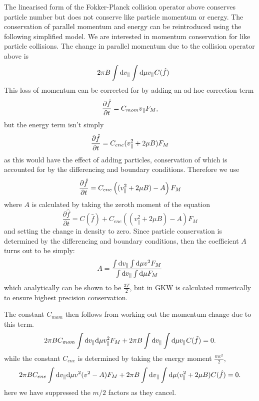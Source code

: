 The linearised form of the Fokker-Planck collision operator above conserves particle number but does not conserve like particle momentum or 
energy. 
The conservation of parallel momentum and energy can be reintroduced using the following simplified model.  
We are interested in momentum conservation for like particle collisions. 
The change in parallel momentum due to the collision operator above is 
\begin{align}
&& 2 \pi B \int {\rm d}v_\parallel \int {\rm d} \mu v_{\parallel} C(\hat{f}) 
\end{align}
This loss of momentum can be corrected for by adding an ad hoc correction term 
\begin{equation} 
{\partial \hat{f} \over \partial t} = C_{mom} v_{\parallel} F_{M},
\end{equation}
but the energy term isn't simply
\begin{equation} 
{\partial \hat{f} \over \partial t} = C_{ene} (v^{2}_{\parallel} + 2\mu B) F_{M}
\end{equation}
as this would have the effect of adding particles, conservation of which is accounted for by
the differencing and boundary conditions.  Therefore we use
\begin{equation} 
{\partial \hat{f} \over \partial t} = C_{ene}\left( (v^{2}_{\parallel} + 2\mu B) - A\right)F_{M}
\end{equation}
where $A$ is calculated by taking the zeroth moment of the equation
\begin{equation}
\frac{\partial \hat{f}}{\partial t} =  C(\hat{f}) + C_{ene}\left( (v^{2}_{\parallel} + 2\mu B) - A\right)F_{M}
\end{equation}
and setting the change in density to zero.  Since particle conservation is determined by the differencing and boundary conditions, then the coefficient $A$ turns out to be simply:
\begin{equation}
A = \frac{\int {\rm d}v_\parallel \int {\rm d} \mu v^2 F_{M} }{\int {\rm d}v_\parallel \int {\rm d} \mu F_{M}}
\end{equation}
which analytically can be shown to be $\frac{3T}{2}$, but in GKW is calculated numerically to ensure highest precision conservation.

The constant $C_{mom}$ then follows from working out the momentum change due to this term. 
\begin{equation} 
2 \pi B C_{mom} \int {\rm d} v_{\parallel} {\rm d} \mu v_{\parallel}^2 F_{M} +  2 \pi B \int {\rm d}v_\parallel \int {\rm d} \mu v_{\parallel} C(\hat{f}) = 0.
\end{equation} 
while the constant $C_{ene}$ is determined by taking the energy moment $\frac{mv^{2}}{2}$, 
\begin{equation} 
2 \pi B C_{ene} \int {\rm d} v_{\parallel}{\rm d} \mu v^{2}(v^{2}-A) F_{M} +  2 \pi B \int {\rm d}v_\parallel \int {\rm d} \mu (v_{\parallel}^2 + 2\mu B) C(\hat{f}) = 0.
\end{equation}
here we have suppressed the $m/2$ factors as they cancel.

